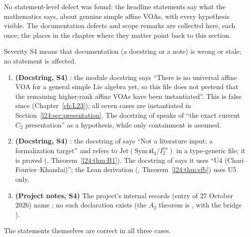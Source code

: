 No statement-level defect was found: the headline statements say what the mathematics says, about genuine simple
affine VOAs, with every hypothesis visible. The documentation defects and scope remarks are collected here, each once;
the places in the chapter where they matter point back to this section.

\begin{warning}[title={Documentation defects (Lean docstrings and project notes)}]
Severity S4 means that documentation (a docstring or a note) is wrong or stale; no statement is affected.
\begin{enumerate}
\item \textbf{(Docstring, S4)} : the module docstring says ``There is no
  universal affine VOA for a general simple Lie algebra yet, so this file does not pretend that the remaining higher-rank
  affine VOAs have been instantiated''. This is false since  (Chapter~\ref{ch:L23}); all seven
  cases are instantiated in Section~\ref{l24:sec:presentation}. The docstring of
   speaks of ``the exact current $C_2$ presentation'' as a hypothesis, while only
  containment is assumed.
\item \textbf{(Docstring, S4)} : the docstring of  says ``Not a
  literature input: a formalization target'' and refers to $\mathrm{Jet}(\mathrm{Sym}\,\mathfrak{sl}_3/I_2^{ns})$ in a type-generic
  file; it is proved (, Theorem~\ref{l24:thm:B1}). The docstring of 
  says it uses ``U4 (Chari--Fourier--Khandai)''; the Lean derivation (, Theorem~\ref{l24:thm:sfb})
  uses U5 only.
\item \textbf{(Project notes, S4)} The project's internal records (entry of 27 October 2026) name ; no such declaration
  exists (the $A_2$ theorem is , with the bridge
  ).
\end{enumerate}
The statements themselves are correct in all three cases.
\end{warning}

